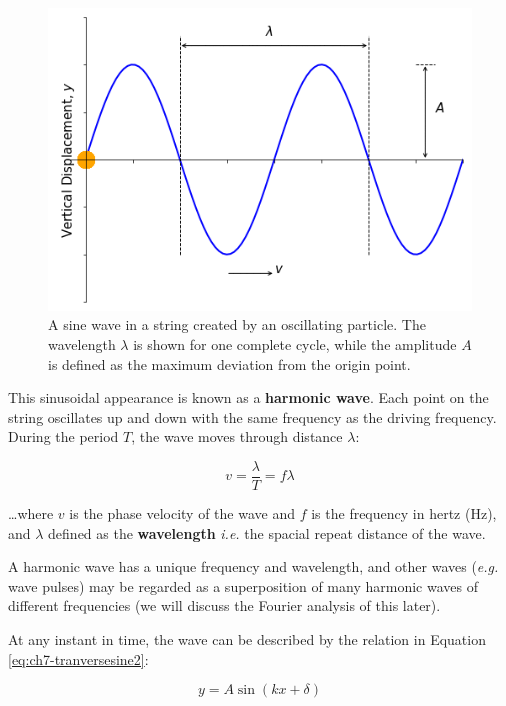 \documentclass[
]{book}
\begin{document}
\begin{figure}

{\centering \includegraphics[width=0.7\linewidth]{visualisations/ch7-transversesine1} 

}

\caption{A sine wave in a string created by an oscillating particle.  The wavelength $\lambda$ is shown for one complete cycle, while the amplitude $A$ is defined as the maximum deviation from the origin point.}\label{fig:ch7-transversesine1}
\end{figure}

This sinusoidal appearance is known as a \textbf{harmonic wave}. Each point on the string oscillates up and down with the same frequency as the driving frequency. During the period \(T\), the wave moves through distance \(\lambda\):

\begin{equation}
v = \frac{\lambda}{T} = f\lambda
\label{eq:ch7-tranversesine1}
\end{equation}

\ldots where \(v\) is the phase velocity of the wave and \(f\) is the frequency in hertz (Hz), and \(\lambda\) defined as the \textbf{wavelength} \emph{i.e.} the spacial repeat distance of the wave.

A harmonic wave has a unique frequency and wavelength, and other waves (\emph{e.g.} wave pulses) may be regarded as a superposition of many harmonic waves of different frequencies (we will discuss the Fourier analysis of this later).

At any instant in time, the wave can be described by the relation in Equation \eqref{eq:ch7-tranversesine2}:

\begin{equation}
y = A \sin(kx + \delta)
\label{eq:ch7-tranversesine2}
\end{equation}
\end{document}
